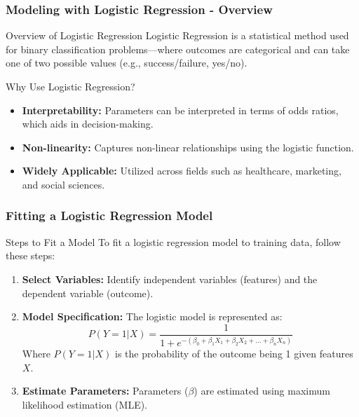 \documentclass[aspectratio=169]{beamer}
\begin{document}
\begin{frame}[fragile]
    \frametitle{Modeling with Logistic Regression - Overview}
    \begin{block}{Overview of Logistic Regression}
        Logistic Regression is a statistical method used for binary classification problems—where outcomes are categorical and can take one of two possible values (e.g., success/failure, yes/no).
    \end{block}
    
    \begin{block}{Why Use Logistic Regression?}
        \begin{itemize}
            \item \textbf{Interpretability:} Parameters can be interpreted in terms of odds ratios, which aids in decision-making.
            \item \textbf{Non-linearity:} Captures non-linear relationships using the logistic function.
            \item \textbf{Widely Applicable:} Utilized across fields such as healthcare, marketing, and social sciences.
        \end{itemize}
    \end{block}
\end{frame}

\begin{frame}[fragile]
    \frametitle{Fitting a Logistic Regression Model}
    \begin{block}{Steps to Fit a Model}
        To fit a logistic regression model to training data, follow these steps:
        \begin{enumerate}
            \item \textbf{Select Variables:} Identify independent variables (features) and the dependent variable (outcome).
            \item \textbf{Model Specification:} The logistic model is represented as:
            \begin{equation}
                P(Y=1|X) = \frac{1}{1 + e^{-(\beta_0 + \beta_1 X_1 + \beta_2 X_2 + ... + \beta_n X_n)}}
            \end{equation}
            Where \(P(Y=1|X)\) is the probability of the outcome being 1 given features \(X\).
            \item \textbf{Estimate Parameters:} Parameters (\(\beta\)) are estimated using maximum likelihood estimation (MLE).
        \end{enumerate}
    \end{block}
\end{frame}
\end{document}
